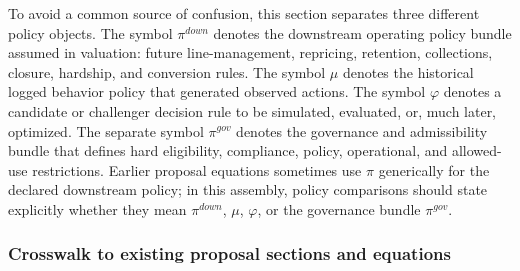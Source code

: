 \documentclass[11pt]{article}
\newcommand{\1}{\mathbf{1}}
\begin{document}
To avoid a common source of confusion, this section separates three different
policy objects. The symbol $\pi^{down}$ denotes the downstream operating policy
bundle assumed in valuation: future line-management, repricing, retention,
collections, closure, hardship, and conversion rules. The symbol $\mu$ denotes
the historical logged behavior policy that generated observed actions. The
symbol $\varphi$ denotes a candidate or challenger decision rule to be simulated,
evaluated, or, much later, optimized. The separate symbol $\pi^{gov}$ denotes
the governance and admissibility bundle that defines hard eligibility,
compliance, policy, operational, and allowed-use restrictions. Earlier proposal
equations sometimes use $\pi$ generically for the declared downstream policy; in
this assembly, policy comparisons should state explicitly whether they mean
$\pi^{down}$, $\mu$, $\varphi$, or the governance bundle $\pi^{gov}$.

\subsubsection{Crosswalk to existing proposal sections and equations}
\label{subsec:state-space-crosswalk}
\end{document}

